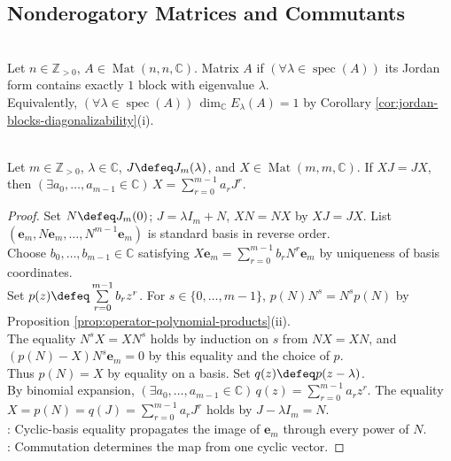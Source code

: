 \subsection{Nonderogatory Matrices and Commutants}
\begin{definition} \label{def:nonderogatory-matrix} \\
Let $n\in\mathbb{Z}_{>0}$, $A\in\operatorname{Mat}(n,n,\mathbb{C})$. Matrix $A$  if $(\forall\lambda\in\operatorname{spec}(A))$ its Jordan form contains exactly $1$ block with eigenvalue $\lambda$.\\
Equivalently, $(\forall\lambda\in\operatorname{spec}(A))\,\dim_{\mathbb{C}}E_{\lambda}(A)=1$ by Corollary \ref{cor:jordan-blocks-diagonalizability}(i).
\end{definition}

\begin{lemma} \label{lem:single-jordan-block-commutant-polynomials} \\
Let $m\in\mathbb{Z}_{>0}$, $\lambda\in\mathbb{C}$, $J\defeq J_m(\lambda)$, and $X\in\operatorname{Mat}(m,m,\mathbb{C})$. If $XJ=JX$, then $(\exists a_0,\ldots,a_{m-1}\in\mathbb{C})\,X=\sum\limits_{r=0}^{m-1}a_rJ^r$.
\begin{proof}
Set $N\defeq J_m(0)$; $J=\lambda I_m+N$, $XN=NX$ by $XJ=JX$. List $(\mathbf{e}_m,N\mathbf{e}_m,\ldots,N^{m-1}\mathbf{e}_m)$ is standard basis in reverse order.\\
Choose $b_0,\ldots,b_{m-1}\in\mathbb{C}$ satisfying $X\mathbf{e}_m=\sum\limits_{r=0}^{m-1}b_rN^r\mathbf{e}_m$ by uniqueness of basis coordinates.\\
Set $p(z)\defeq\sum\limits_{r=0}^{m-1}b_rz^r$. For $s\in\{0,\ldots,m-1\}$, $p(N)N^s=N^sp(N)$ by Proposition \ref{prop:operator-polynomial-products}(ii).\\
The equality $N^sX=XN^s$ holds by induction on $s$ from $NX=XN$, and $(p(N)-X)N^s\mathbf{e}_m=0$ by this equality and the choice of $p$.\\
Thus $p(N)=X$ by equality on a basis. Set $q(z)\defeq p(z-\lambda)$.\\
By binomial expansion, $(\exists a_0,\ldots,a_{m-1}\in\mathbb{C})\,q(z)=\sum\limits_{r=0}^{m-1}a_rz^r$. The equality $X=p(N)=q(J)=\sum\limits_{r=0}^{m-1}a_rJ^r$ holds by $J-\lambda I_m=N$.\\
: Cyclic-basis equality propagates the image of $\mathbf{e}_m$ through every power of $N$.\\
: Commutation determines the map from one cyclic vector.
\end{proof}
\end{lemma}


